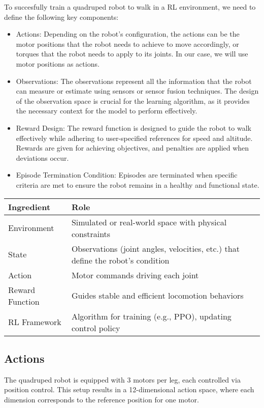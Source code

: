 To succesfully train a quadruped robot to walk in a RL environment, we need to define the following key components:

\begin{itemize}
	\item Actions: Depending on the robot's configuration, the actions can be the motor positions that the robot needs to achieve to move accordingly, or torques that the robot needs to apply to its joints. In our case, we will use motor positions as actions.
	\item Observations: The observations represent all the information that the robot can measure or estimate using sensors or sensor fusion techniques. The design of the observation space is crucial for the learning algorithm, as it provides the necessary context for the model to perform effectively.
	\item Reward Design: The reward function is designed to guide the robot to walk effectively while adhering to user-specified references for speed and altitude. Rewards are given for achieving objectives, and penalties are applied when deviations occur.
	\item Episode Termination Condition: Episodes are terminated when specific criteria are met to ensure the robot remains in a healthy and functional state.
\end{itemize}

\begin{tabular}{ll}
	\hline
	\textbf{Ingredient} & \textbf{Role} \\
	\hline
	Environment         & Simulated or real-world space with physical constraints \\
	State               & Observations (joint angles, velocities, etc.) that define the robot’s condition \\
	Action              & Motor commands driving each joint                     \\
	Reward Function     & Guides stable and efficient locomotion behaviors      \\
	RL Framework        & Algorithm for training (e.g., PPO), updating control policy \\
	\hline
\end{tabular}

\subsection{Actions}

The quadruped robot is equipped with 3 motors per leg, each controlled via position control. This setup results in a 12-dimensional action space, where each dimension corresponds to the reference position for one motor.

